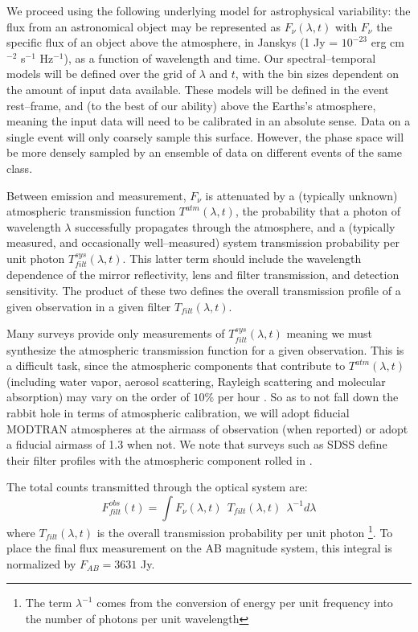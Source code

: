 We proceed using the following underlying model for astrophysical variability:
the flux from an astronomical object may be represented as $F_\nu(\lambda, t)$
with $F_\nu$ the specific flux of an object above the atmosphere, in Janskys (1
Jy = $10^{-23}$ erg cm$^{-2}$ s$^{-1}$ Hz$^{-1}$), as a function of wavelength
and time.  Our spectral--temporal models will be defined over the grid of
$\lambda$ and $t$, with the bin sizes dependent on the amount of input data
available.  These models will be defined in the event rest--frame, and (to the
best of our ability) above the Earths's atmosphere, meaning the input data will
need to be calibrated in an absolute sense. Data on a single event will only
coarsely sample this surface.  However, the phase space will be more densely
sampled by an ensemble of data on different events of the same class.


Between emission and measurement, $F_\nu$ is attenuated by a (typically unknown)
atmospheric transmission function $T^{atm}(\lambda, t)$, the probability that a
photon of wavelength $\lambda$ successfully propagates through the atmosphere,
and a (typically measured, and occasionally well--measured) system transmission
probability per unit photon $T^{sys}_{filt}(\lambda, t)$.  This latter term
should include the wavelength dependence of the mirror reflectivity, lens and
filter transmission, and detection sensitivity.  The product of these two
defines the overall transmission profile of a given observation in a given
filter $T_{filt}(\lambda, t)$.

Many surveys provide only measurements of $T^{sys}_{filt}(\lambda, t)$
\citep[e.g.][]{2006ApJ...646.1436S} meaning we must synthesize the atmospheric
transmission function for a given observation.  This is a difficult task, since
the atmospheric components that contribute to $T^{atm}(\lambda, t)$ (including
water vapor, aerosol scattering, Rayleigh scattering and molecular absorption)
may vary on the order of $10\%$ per hour \citep{2007PASP..119.1163S}.  So as to
not fall down the rabbit hole in terms of atmospheric calibration, we will adopt
fiducial MODTRAN atmospheres \citep{1999SPIE.3756..348B} at the airmass of
observation (when reported) or adopt a fiducial airmass of 1.3 when not.  We
note that surveys such as SDSS define their filter profiles with the atmospheric
component rolled in \citep{2007AJ....134..973I}.

The total counts transmitted through the optical system are: $$F^{obs}_{filt}
(t) = \int F_\nu(\lambda, t) ~~ T_{filt} (\lambda, t) ~~ \lambda^{-1} d\lambda$$
where $T_{filt}(\lambda, t)$ is the overall transmission probability per unit
photon \footnote{The term $\lambda^{-1}$ comes from the conversion of energy per
unit frequency into the number of photons per unit wavelength}. To place the
final flux measurement on the AB magnitude system, this integral is normalized
by $F_{AB} = 3631$ Jy.


